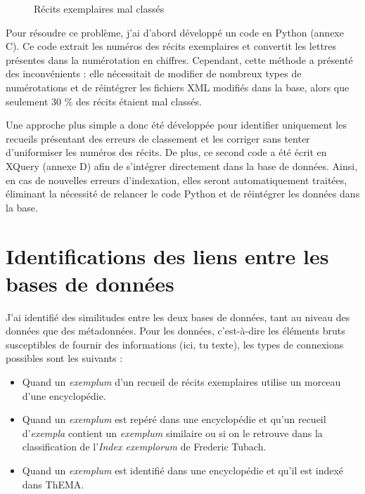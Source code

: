 \begin{figure}[H]
	\centering
	\caption{Récits exemplaires mal classés}
\end{figure}

Pour résoudre ce problème, j'ai d'abord développé un code en Python (annexe C). Ce code extrait les numéros des récits exemplaires et convertit les lettres présentes dans la numérotation en chiffres. Cependant, cette méthode a présenté des inconvénients : elle nécessitait de modifier de nombreux types de numérotations et de réintégrer les fichiers XML modifiés dans la base, alors que seulement 30 \% des récits étaient mal classés.

Une approche plus simple a donc été développée pour identifier uniquement les recueils présentant des erreurs de classement et les corriger sans tenter d'uniformiser les numéros des récits. De plus, ce second code a été écrit en XQuery (annexe D) afin de s'intégrer directement dans la base de données. Ainsi, en cas de nouvelles erreurs d'indexation, elles seront automatiquement traitées, éliminant la nécessité de relancer le code Python et de réintégrer les données dans la base.


\section{Identifications des liens entre les bases de données}
J'ai identifié des similitudes entre les deux bases de données, tant au niveau des données que des métadonnées. Pour les données, c’est-à-dire les éléments bruts susceptibles de fournir des informations (ici, tu texte), les types de connexions possibles sont les suivants : \\

\begin{itemize}
	\item Quand un \textit{exemplum} d'un recueil de récits exemplaires utilise un morceau d'une encyclopédie.
	\item Quand un \textit{exemplum} est repéré dans une encyclopédie et qu'un recueil d'\textit{exempla} contient un \textit{exemplum} similaire ou si on le retrouve dans la classification de l'\textit{Index exemplorum} de Frederic Tubach.
	\item Quand un \textit{exemplum} est identifié dans une encyclopédie et qu'il est indexé dans ThEMA.
\end{itemize}

